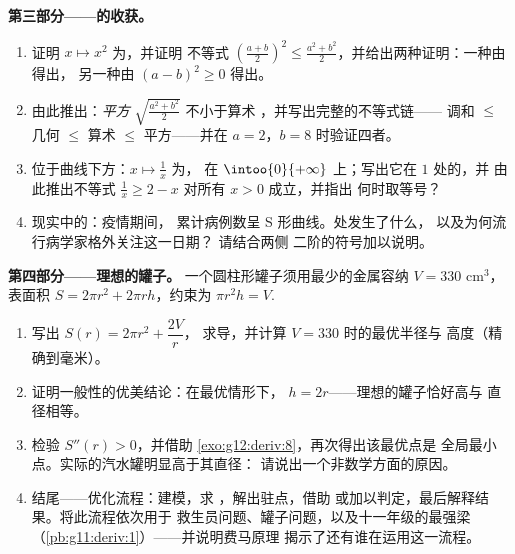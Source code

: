 \begin{problem}
\medskip
\noindent\textbf{第三部分——的收获。}
\begin{enumerate}[resume]
  \item 证明 $x \mapsto x^2$ 为，并证明
        不等式
        $\left(\frac{a + b}{2}\right)^2 \leq
        \frac{a^2 + b^2}{2}$，并给出两种证明：一种由得出，
        另一种由 $(a - b)^2 \geq 0$ 得出。
  \item 由此推出：\emph{平方}
        $\sqrt{\frac{a^2 + b^2}{2}}$ 不小于算术
        ，并写出完整的不等式链——
        调和 $\leq$ 几何 $\leq$ 算术 $\leq$
        平方——并在 $a = 2$，$b = 8$ 时验证四者。
  \item {}位于曲线下方：$x \mapsto \frac1x$ 为，
        在 $\intoo{0}{+\infty}$ 上；写出它在 $1$ 处的，并
        由此推出不等式
        $\frac1x \geq 2 - x$ 对所有 $x > 0$ 成立，并指出
        何时取等号？
  \item 现实中的：疫情期间，
        累计病例数呈 S 形曲线。处发生了什么，
        以及为何流行病学家格外关注这一日期？
        请结合两侧
        二阶的符号加以说明。
\end{enumerate}

\medskip
\noindent\textbf{第四部分——理想的罐子。}
一个圆柱形罐子须用最少的金属容纳 $V = 330$ cm$^3$，
表面积 $S = 2\pi r^2 + 2\pi r h$，约束为
$\pi r^2 h = V$.
\begin{enumerate}[resume]
  \item 写出 $S(r) = 2\pi r^2 + \dfrac{2V}{r}$，
        求导，并计算 $V = 330$ 时的最优半径与
        高度（精确到毫米）。
  \item 证明一般性的优美结论：在最优情形下，
        $h = 2r$——理想的罐子恰好高与
        直径相等。
  \item 检验 $S''(r) > 0$，并借助
        \cref{exo:g12:deriv:8}，再次得出该最优点是
        全局最小点。实际的汽水罐明显高于其直径：
        请说出一个非数学方面的原因。
  \item 结尾——优化流程：建模，求
        ，解出驻点，借助
        或加以判定，最后解释结果。将此流程依次用于
        救生员问题、罐子问题，以及十一年级的最强梁
        （\cref{pb:g11:deriv:1}）——并说明费马原理
        揭示了还有谁在运用这一流程。
\end{enumerate}
\end{problem}
